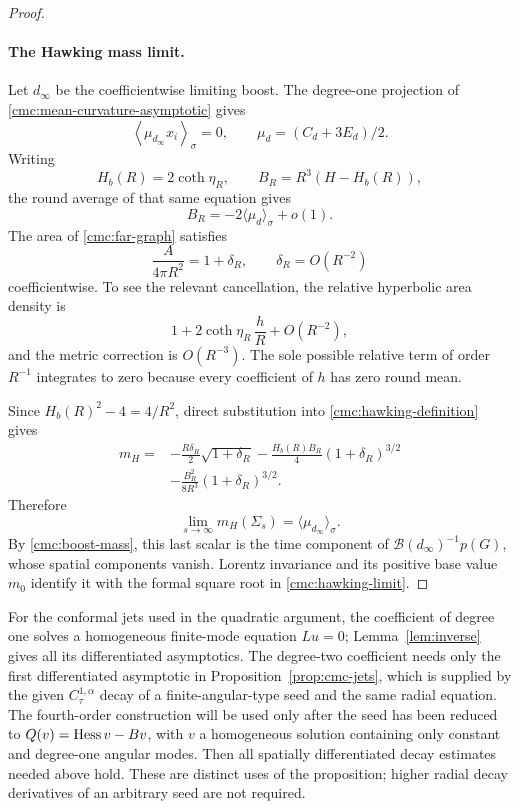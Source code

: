 \begin{proof}
\paragraph{The Hawking mass limit.}
Let \(d_\infty\) be the coefficientwise limiting boost.
The degree-one projection of
\eqref{cmc:mean-curvature-asymptotic} gives
\[
 \left\langle\mu_{d_\infty}x_i\right\rangle_\sigma=0,
 \qquad
 \mu_d=(C_d+3E_d)/2.
\]
Writing
\[
 H_b(R)=2\coth\eta_R,\qquad
 B_R=R^3(H-H_b(R)),
\]
the round average of that same equation gives
\[
 B_R=-2\langle\mu_d\rangle_\sigma+o(1).
\]
The area of \eqref{cmc:far-graph} satisfies
\begin{equation}\label{cmc:area-error}
 \frac{A}{4\pi R^2}=1+\delta_R,\qquad \delta_R=O(R^{-2})
\end{equation}
coefficientwise.  To see the relevant cancellation, the relative
hyperbolic area density is
\[
 1+2\coth\eta_R\,\frac hR+O(R^{-2}),
\]
and the metric correction is \(O(R^{-3})\).  The sole possible
relative term of order \(R^{-1}\) integrates to zero because every
coefficient of \(h\) has zero round mean.

Since \(H_b(R)^2-4=4/R^2\), direct substitution into
\eqref{cmc:hawking-definition} gives
\begin{align*}
 m_H={}&-\frac{R\delta_R}{2}\sqrt{1+\delta_R}
 -\frac{H_b(R)B_R}{4}(1+\delta_R)^{3/2}\\
 &-\frac{B_R^2}{8R^3}(1+\delta_R)^{3/2}.
\end{align*}
Therefore
\[
 \lim_{s\to\infty}m_H(\Sigma_s)
 =\langle\mu_{d_\infty}\rangle_\sigma.
\]
By \eqref{cmc:boost-mass}, this last scalar is the time component of
\(\mathcal B(d_\infty)^{-1}p(G)\), whose spatial components vanish.
Lorentz invariance and its positive base value \(m_0\) identify it
with the formal square root in \eqref{cmc:hawking-limit}.
\end{proof}

\begin{remark}\label{cmc:regularity-budget}
For the conformal jets used in the quadratic argument, the coefficient
of degree one solves a homogeneous finite-mode equation \(Lu=0\);
Lemma~\ref{lem:inverse} gives all its differentiated asymptotics.
The degree-two coefficient needs only the first differentiated
asymptotic in Proposition~\ref{prop:cmc-jets}, which is supplied by the
given \(C^{1,\alpha}_\tau\) decay of a finite-angular-type seed and the
same radial equation.
The fourth-order construction will be used only after the seed has
been reduced to \(Q(v)=\operatorname{Hess} v-Bv\), with \(v\) a homogeneous solution
containing only constant and degree-one angular modes.
Then all spatially differentiated decay estimates needed above hold.
These are distinct uses of the proposition; higher radial decay
derivatives of an arbitrary seed are not required.
\end{remark}

